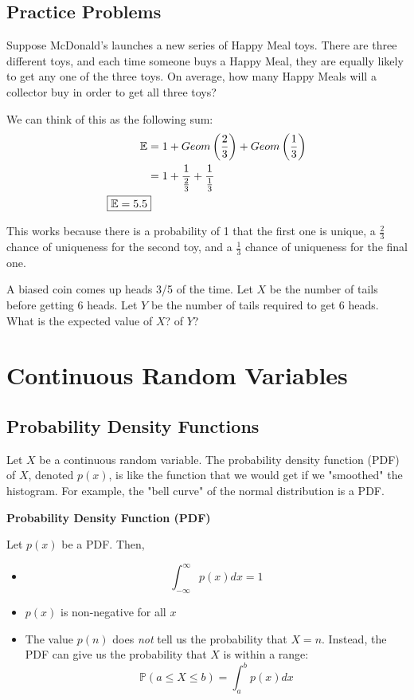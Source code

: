 \documentclass[titlepage, 12pt, leqno]{article}
\begin{document}
\subsection{Practice Problems}
\begin{ex}
    Suppose McDonald's launches a new series of Happy Meal toys. There are three
    different toys, and each time someone buys a Happy Meal, they are equally
    likely to get any one of the three toys. On average, how many Happy Meals
    will a collector buy in order to get all three toys?
    \vspace{10px}
    
    We can think of this as the following sum:
   \begin{align*}
       \mathbb{E} &= 1 + Geom\left(\frac{2}{3}\right) + Geom\left(\frac{1}{3}
           \right) \\
        &= 1 + \frac{1}{\frac{2}{3}} + \frac{1}{\frac{1}{3}} \\
        \Aboxed{ \mathbb{E} = 5.5} 
   \end{align*}

   This works because there is a probability of 1 that the first one is unique,
   a $\frac{2}{3}$ chance of uniqueness for the second toy, and a $\frac{1}{3}$ 
   chance of uniqueness for the final one.
\end{ex}

\begin{ex}
    A biased coin comes up heads 3/5 of the time. Let $X$ be the number of tails
    before getting 6 heads. Let $Y$ be the number of tails required to get 6 
    heads. What is the expected value of $X$? of $Y$?
\end{ex}

\pagebreak
\section{Continuous Random Variables}
\subsection{Probability Density Functions}
Let $X$ be a continuous random variable. The probability density function (PDF)
of $X$, denoted $p(x)$, is like the function that we would get if we "smoothed"
the histogram. For example, the "bell curve" of the normal distribution is a PDF.

\begin{definition}
    \textbf{Probability Density Function (PDF)}

    Let $p(x)$ be a PDF. Then,
    \begin{itemize}
        \item 
            \[
                \int_{-\infty}^{\infty}p(x)dx = 1
            \]
        \item $p(x)$ is non-negative for all $x$
        \item The value $p(n)$ does \textit{not} tell us the probability that
            $X=n$. Instead, the PDF can give us the probability that $X$ is 
            within a range:
            \[
            \mathbb{P}(a \le X \le b) = \int_{a}^{b}p(x)dx
            \]
    \end{itemize}
\end{definition}
\end{document}
